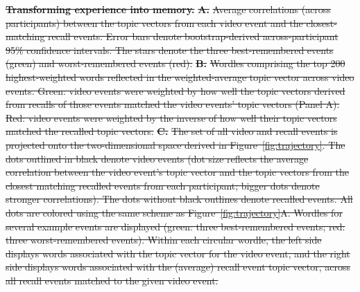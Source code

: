 \documentclass[10pt]{article} %
\providecommand{\DIFdeltex}[1]{{\protect\color{red}\sout{#1}}}                      %
\providecommand{\DIFdelbegin}{} %
\providecommand{\DIFdelFL}[1]{\DIFdel{#1}} %
\providecommand{\DIFdel}[1]{\texorpdfstring{\DIFdeltex{#1}}{}} %
\newcommand{\DIFscaledelfig}{0.5}
\newlength{\DIFdelgraphicswidth} %
\newlength{\DIFdelgraphicsheight} %
\newcommand{\DIFdelincludegraphics}[2][]{%
\sbox{\DIFdelgraphicsbox}{\DIFOincludegraphics[#1]{#2}}%
\settoboxwidth{\DIFdelgraphicswidth}{\DIFdelgraphicsbox} %
\settoboxtotalheight{\DIFdelgraphicsheight}{\DIFdelgraphicsbox} %
\scalebox{\DIFscaledelfig}{%
\parbox[b]{\DIFdelgraphicswidth}{\usebox{\DIFdelgraphicsbox}\\[-\baselineskip] \rule{\DIFdelgraphicswidth}{0em}}\llap{\resizebox{\DIFdelgraphicswidth}{\DIFdelgraphicsheight}{%
\setlength{\unitlength}{\DIFdelgraphicswidth}%
\begin{picture}(1,1)%
\thicklines\linethickness{2pt} %
{\color[rgb]{1,0,0}\put(0,0){\framebox(1,1){}}}%
{\color[rgb]{1,0,0}\put(0,0){\line( 1,1){1}}}%
{\color[rgb]{1,0,0}\put(0,1){\line(1,-1){1}}}%
\end{picture}%
}\hspace*{3pt}}} %
} %
\DeclareRobustCommand{\DIFdelbegin}{\DIFOdelbegin \let\includegraphics\DIFdelincludegraphics} %
\begin{document}
\DIFdelbegin %
{%
\textbf{\DIFdelFL{Transforming experience into memory.}} %
\textbf{\DIFdelFL{A.}} %
\DIFdelFL{Average correlations (across participants) between the topic vectors from each video event and the closest-matching recall events.  Error bars denote bootstrap-derived across-participant 95\% confidence intervals.  The stars denote the three best-remembered events (green) and worst-remembered events (red).  }\textbf{\DIFdelFL{B.}} %
\DIFdelFL{Wordles comprising the top 200 highest-weighted words reflected in the weighted-average topic vector across video events.  Green: video events were weighted by how well the topic vectors derived from recalls of those events matched the video events' topic vectors (Panel A).  Red: video events were weighted by the inverse of how well their topic vectors matched the recalled topic vectors.  }\textbf{\DIFdelFL{C.}}  %
\DIFdelFL{The set of all video and recall events is projected onto the two-dimensional space derived in Figure~\ref{fig:trajectory}.  The dots outlined in black denote video events (dot size reflects the average correlation between the video event's topic vector and the topic vectors from the closest matching recalled events from each participant; bigger dots denote stronger correlations).  The dots without black outlines denote recalled events.  All dots are colored using the same scheme as Figure~\ref{fig:trajectory}A.  Wordles for several example events are displayed (green: three best-remembered events; red: three worst-remembered events).  Within each circular wordle, the left side displays words associated with the topic vector for the video event, and the right side displays words associated with the (average) recall event topic vector, across all recall events matched to the given video event.}}
\end{document}
